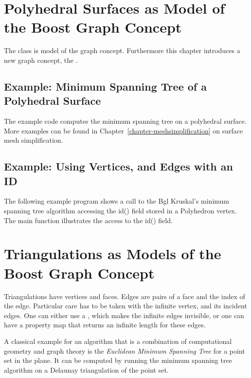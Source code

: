 \section{Polyhedral Surfaces as Model of the Boost Graph Concept}

The class  is model of the graph concept.  Furthermore
this chapter introduces a new graph concept, the .

\subsection{Example: Minimum Spanning Tree of a Polyhedral Surface}

The example code computes the minimum spanning tree on a polyhedral surface.
More examples can be found in Chapter~\ref{chapter-meshsimplification} on surface mesh simplification.




\subsection{Example: Using Vertices, and Edges with an ID}

The following example program shows a call to the {\sc Bgl} 
Kruskal's minimum spanning tree algorithm accessing the id() 
field stored in a Polyhedron vertex.\\
The main function illustrates the access to the id() field.




\section{Triangulations as Models of the Boost Graph Concept}

Triangulations have vertices and faces. Edges are pairs of a face and the
index of the edge.
Particular care has to be taken with the infinite vertex, and its incident
edges. One can either use a , which makes the infinite edges
invisible, or one can have a property map that returns an infinite length
for these edges.


A classical example for an algorithm that is a combination of
computational geometry and graph theory is the {\em Euclidean Minimum
Spanning Tree} for a point set in the plane.  It can be computed by
running the minimum spanning tree algorithm on a Delaunay
triangulation of the point set.

